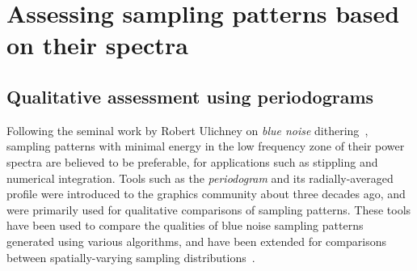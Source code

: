 %
%
%
\section{Assessing sampling patterns based on their spectra}

\subsection{Qualitative assessment using periodograms}
Following the seminal work by Robert Ulichney on \emph{blue noise} dithering~\cite{Ulichney:87:halftoning}, sampling patterns with minimal energy in the low frequency zone of their power spectra are believed to be preferable, for applications such as stippling and numerical integration. Tools such as the \emph{periodogram} and its radially-averaged profile were introduced to the graphics community about three decades ago, and were primarily used for qualitative comparisons of sampling patterns. 
%
These tools have been used to compare the qualities of blue noise sampling patterns generated using various algorithms, and have been extended for comparisons between spatially-varying sampling distributions~\cite{Wei:2011:DDA}. 


